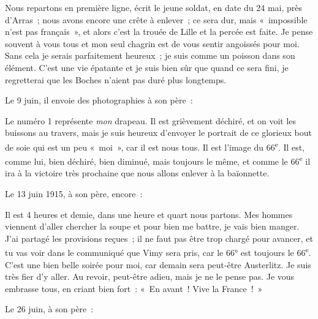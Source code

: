 \documentclass[french,twoside]{book} %
\newenvironment{quoteblock}%
  {\begin{quoting}}
  {\end{quoting}}
\newenvironment{quotebar}{%
    \def\FrameCommand{{\color{rubric!10!}\vrule width 0.5em} \hspace{0.9em}}%
    \def\OuterFrameSep{\itemsep} %
    \MakeFramed {\advance\hsize-\width \FrameRestore}
  }%
  {%
    \endMakeFramed
  }
\renewenvironment{quoteblock}%
  {%
    \savenotes
    \setstretch{0.9}
    \normalfont
    \begin{quotebar}
  }
  {%
    \end{quotebar}
    \spewnotes
  }
\begin{document}
\begin{quoteblock}
 \noindent Nous repartons en première ligne, écrit le jeune soldat, en date du 24 mai, près d’Arras ; nous avons encore une crête à enlever ; ce sera dur, mais « impossible n’est pas français », et alors c’est la trouée de Lille et la percée est faite. Je pense souvent à vous tous et mon seul chagrin est de vous sentir angoissés pour moi. Sans cela je serais parfaitement heureux ; je suis comme un poisson dans son élément. C’est une vie épatante et je suis bien sûr que quand ce sera fini, je regretterai que les Boches n’aient pas duré plus longtemps.‌
 \end{quoteblock}

\noindent Le 9 juin, il envoie des photographies à son père :‌\par

\begin{quoteblock}
 \noindent Le numéro 1 représente {\itshape mon} drapeau. Il est grièvement déchiré, et on voit les buissons au travers, mais je suis heureux d’envoyer le portrait de ce glorieux bout de soie qui est un peu « moi », car il est nous tous. Il est l’image du 66\textsuperscript{e}. Il est, comme lui, bien déchiré, bien diminué, mais toujours le même, et comme le 66\textsuperscript{e} il ira à la victoire très prochaine que nous allons enlever à la baïonnette.‌
 \end{quoteblock}

\noindent Le 13 juin 1915, à son père, encore :‌\par

\begin{quoteblock}
 \noindent Il est 4 heures et demie, dans une heure et quart nous partons. Mes hommes viennent d’aller chercher la soupe et pour bien me battre, je vais bien manger. J’ai partagé les provisions reçues ; il ne faut pas être trop chargé pour avancer, et tu vas voir dans le communiqué que Vimy sera pris, car le 66° est toujours le 66\textsuperscript{e}. C’est une bien belle soirée pour moi, car demain sera peut-être Austerlitz. Je suis très fier d’y aller. Au revoir, peut-être adieu, mais je ne le pense pas. Je vous embrasse tous, en criant bien fort : « En avant ! Vive la France ! »‌
 \end{quoteblock}

\noindent Le 26 juin, à son père :‌\par
\end{document}
